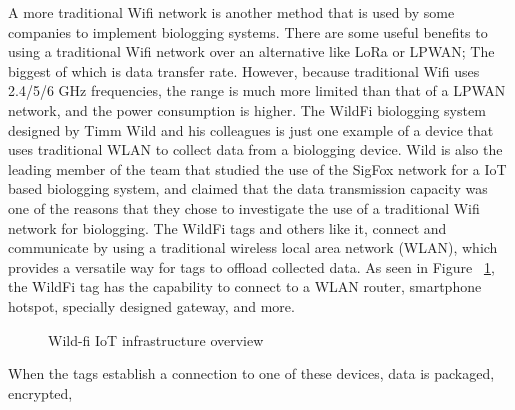 \documentclass[sigplan,screen,nonacm]{acmart}
\begin{document}
A more traditional Wifi network is another method that is used by some companies to 
implement biologging systems. There are some useful benefits to using a traditional 
Wifi network over an alternative like LoRa or LPWAN; The biggest of which is data 
transfer rate. However, because traditional Wifi uses 2.4/5/6 GHz frequencies, the range is much more limited 
than that of a LPWAN network, and the power consumption is higher. The WildFi biologging system designed by 
Timm Wild and his colleagues is just one example of a device that uses traditional 
WLAN to collect data from a biologging device. Wild is also the leading member of the 
team that studied the use of the SigFox network for a IoT based biologging system, and 
claimed that the data transmission capacity was one of the reasons that they chose to 
investigate the use of a traditional Wifi network for biologging\cite{wild2023internet}. 
The WildFi tags and others like it, connect and communicate by using a traditional wireless 
local area network (WLAN), which provides a versatile way for tags to offload collected data. 
As seen in Figure ~\ref{fig:wild-fi_IoT_diagram}, the WildFi tag has the capability to 
connect to a WLAN router, smartphone hotspot, specially designed gateway, and more.
\begin{figure}[htbp]
  \centering
  \caption{Wild-fi IoT infrastructure overview \cite{wild2023internet}}
  \label{fig:wild-fi_IoT_diagram}
\end{figure}
When the tags establish a connection to one of these devices, data is packaged, encrypted, 
\end{document}
